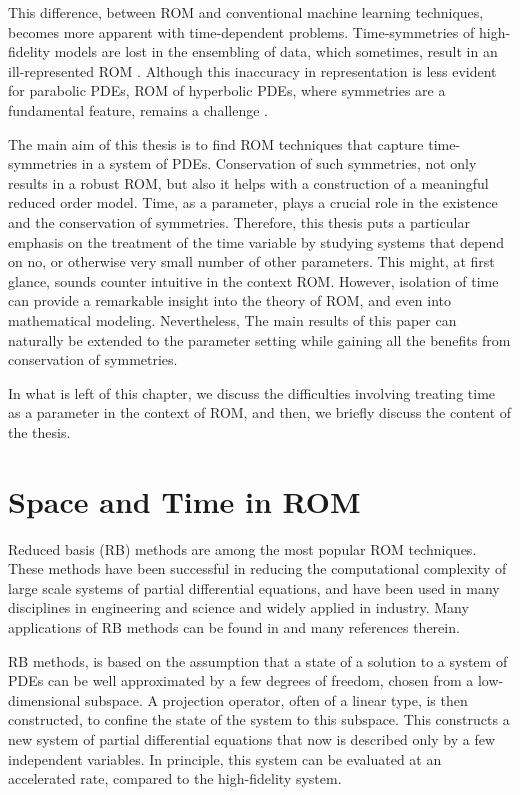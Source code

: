 This difference, between ROM and conventional machine learning techniques, becomes more apparent with time-dependent problems. Time-symmetries of high-fidelity models are lost in the ensembling of data, which sometimes, result in an ill-represented ROM \cite{doi:10.1137/1.9780898718713}. Although this inaccuracy in representation is less evident for parabolic PDEs, ROM of hyperbolic PDEs, where symmetries are a fundamental feature, remains a challenge \cite{doi:10.1137/17M1111991,kalashnikova2014stabilization,farhat2015structure,doi:10.1137/110836742,doi:10.1137/140959602,beattie2011structure,doi:10.1137/140978922}.

The main aim of this thesis is to find ROM techniques that capture time-symmetries in a system of PDEs. Conservation of such symmetries, not only results in a robust ROM, but also it helps with a construction of a meaningful reduced order model. Time, as a parameter, plays a crucial role in the existence and the conservation of symmetries. Therefore, this thesis puts a particular emphasis on the treatment of the time variable by studying systems that depend on no, or otherwise very small number of other parameters. This might, at first glance, sounds counter intuitive in the context ROM. However, isolation of time can provide a remarkable insight into the theory of ROM, and even into mathematical modeling. Nevertheless, The main results of this paper can naturally be extended to the parameter setting while gaining all the benefits from conservation of symmetries.

In what is left of this chapter, we discuss the difficulties involving treating time as a parameter in the context of ROM, and then, we briefly discuss the content of the thesis.

\section{Space and Time in ROM}
Reduced basis (RB) methods are among the most popular ROM techniques. These methods have been successful in reducing the computational complexity of large scale systems of partial differential equations, and have been used in many disciplines in engineering and science and widely applied in industry. Many applications of RB methods can be found in \cite{hesthaven2015certified,quarteroni2015reduced,doi:10.1137/1.9781611974829,doi:10.1137/1.9780898718713} and many references therein.

RB methods, is based on the assumption that a state of a solution to a system of PDEs can be well approximated by a few degrees of freedom, chosen from a low-dimensional subspace. A projection operator, often of a linear type, is then constructed, to confine the state of the system to this subspace. This constructs a new system of partial differential equations that now is described only by a few independent variables. In principle, this system can be evaluated at an accelerated rate, compared to the high-fidelity system.

